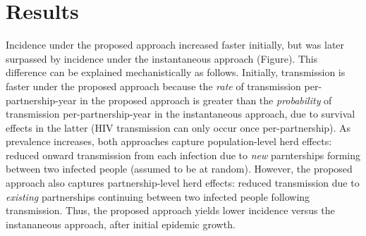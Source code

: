 \section{Results}
Incidence under the proposed approach increased faster initially,
but was later surpassed by incidence under the instantaneous approach (Figure).
This difference can be explained mechanistically as follows.
Initially, transmission is faster under the proposed approach
because the \emph{rate} of transmission per-partnership-year in the proposed approach
is greater than the \emph{probability} of transmission per-partnership-year in the instantaneous approach,
due to survival effects in the latter (HIV transmission can only occur once per-partnership).
As prevalence increases, both approaches capture population-level herd effects:
reduced onward transmission from each infection due to
\emph{new} parnterships forming between two infected people (assumed to be at random).
However, the proposed approach also captures partnership-level herd effects:
reduced transmission due to \emph{existing} partnerships
continuing between two infected people following transmission.
Thus, the proposed approach yields lower incidence versus the instananeous approach,
after initial epidemic growth.
